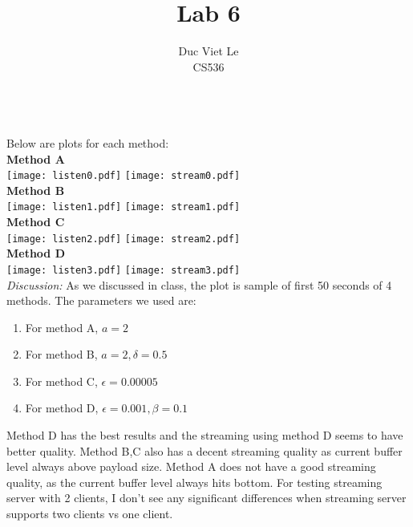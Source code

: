 \documentclass[12pt]{article}
\newenvironment{problem}[2][Problem]{\begin{trivlist}
\item[\hskip \labelsep {\bfseries #1}\hskip \labelsep {\bfseries #2.}]}{\end{trivlist}}
\begin{document}
 
\title{Lab 6}
\author{Duc Viet Le\\
 CS536}
 
\maketitle
 
\begin{problem}{1} \ \\
Below are plots for each method:
\\
\textbf{Method A} \\
\texttt{[image: listen0.pdf]}
\texttt{[image: stream0.pdf]}
\\
\textbf{Method B} \\
\texttt{[image: listen1.pdf]}
\texttt{[image: stream1.pdf]}
\\
\textbf{Method C} \\
\texttt{[image: listen2.pdf]}
\texttt{[image: stream2.pdf]}
\\
\textbf{Method D}
\\
\texttt{[image: listen3.pdf]}
\texttt{[image: stream3.pdf]}
\\
\textit{Discussion:}
As we discussed in class, the plot is sample of first 50 seconds of 4 methods. The parameters we used are:
\begin{enumerate}
	\item For method A, $a = 2$
	\item For method B, $a = 2, \delta = 0.5$
	\item For method C, $\epsilon = 0.00005$
	\item For method D, $\epsilon = 0.001, \beta = 0.1$
\end{enumerate}
Method D has the best results and the streaming using method D seems to have better quality. Method B,C also has a decent streaming quality as current buffer level always above payload size. Method A does not have a good streaming quality, as the current buffer level always hits bottom. For testing streaming server with 2 clients, I don't see any significant differences when streaming server supports two clients vs one client.
\end{problem}
\end{document}

